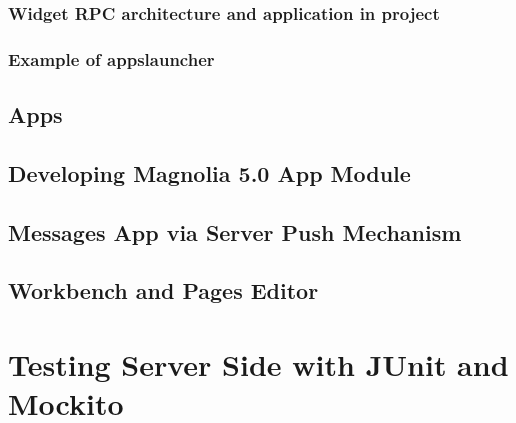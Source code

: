 \subsubsection{Widget RPC architecture and application in project}

\subsubsection{Example of appslauncher}

\subsection{Apps}

\subsection{Developing Magnolia 5.0 App Module}

\subsection{Messages App via Server Push Mechanism}

\subsection{Workbench and Pages Editor}

\section{Testing Server Side with JUnit and Mockito}

\pagebreak